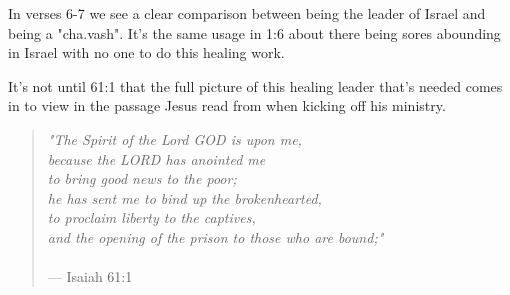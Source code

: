\documentclass[11pt]{article}
\begin{document}

In verses 6-7 we see a clear comparison between being the leader of Israel and being a "cha.vash". It's the same usage in 1:6 about there being sores abounding in Israel with no one to do this healing work.

{\vspace{1em}}

It's not until 61:1 that the full picture of this healing leader that's needed comes in to view in the passage Jesus read from
when kicking off his ministry.

{\vspace{1em}}

\begin{quote}
\textit{"The Spirit of the Lord GOD is upon me,\\ because the LORD has anointed me\\to bring good news to the poor;\\ he has sent me to bind up the brokenhearted,\\ to proclaim liberty to the captives,\\ and the opening of the prison to those who are bound;"}\\\\
\hfill --- Isaiah 61:1
\end{quote}
\end{document}
